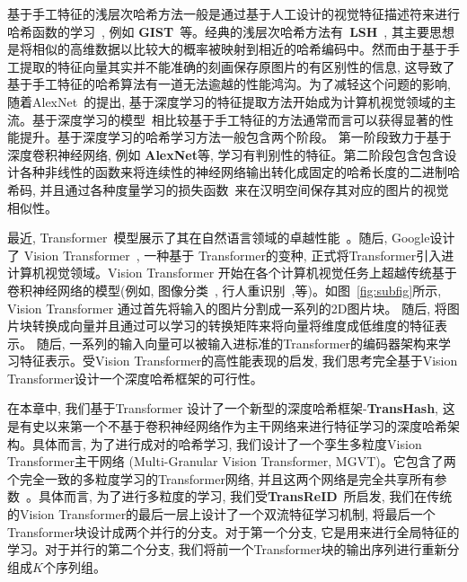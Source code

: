 基于手工特征的浅层次哈希方法一般是通过基于人工设计的视觉特征描述符来进行哈希函数的学习~\cite{charikar2002similarity, indyk1997locality, weiss2008spectral}, 例如 \textbf{GIST}~\cite{oliva2001modeling}等。经典的浅层次哈希方法有~\textbf{LSH}~\cite{indyk1997locality}, 其主要思想是将相似的高维数据以比较大的概率被映射到相近的哈希编码中。然而由于基于手工提取的特征向量其实并不能准确的刻画保存原图片的有区别性的信息, 这导致了基于手工特征的哈希算法有一道无法逾越的性能鸿沟。为了减轻这个问题的影响, 随着AlexNet~\cite{}的提出, 基于深度学习的特征提取方法开始成为计算机视觉领域的主流。基于深度学习的模型~\cite{dosovitskiy2020image, russakovsky2015imagenet}相比较基于手工特征的方法通常而言可以获得显著的性能提升。基于深度学习的哈希学习方法一般包含两个阶段。 第一阶段致力于基于深度卷积神经网络, 例如 \textbf{AlexNet}等, 学习有判别性的特征。第二阶段包含包含设计各种非线性的函数来将连续性的神经网络输出转化成固定的哈希长度的二进制哈希码, 并且通过各种度量学习的损失函数~\cite{cakir2019hashing,cao2018deep,erin2015deep,gong2012iterative, li2015feature}来在汉明空间保存其对应的图片的视觉相似性。 \par
最近, Transformer~\cite{vaswani2017attention}模型展示了其在自然语言领域的卓越性能~\cite{brown2020language, devlin2018bert}。随后, Google设计了 Vision Transformer~\cite{dosovitskiy2020image}, 一种基于 Transformer的变种, 正式将Transformer引入进计算机视觉领域。Vision Transformer 开始在各个计算机视觉任务上超越传统基于卷积神经网络的模型(例如, 图像分类~\cite{dosovitskiy2020image}, 行人重识别~\cite{he2021transreid},等)。如图~\ref{fig:subfig}所示, Vision Transformer 通过首先将输入的图片分割成一系列的2D图片块。 随后, 将图片块转换成向量并且通过可以学习的转换矩阵来将向量将维度成低维度的特征表示。 随后, 一系列的输入向量可以被输入进标准的Transformer的编码器架构来学习特征表示。受Vision Transformer的高性能表现的启发, 我们思考完全基于Vision Transformer设计一个深度哈希框架的可行性。\par
在本章中, 我们基于Transformer 设计了一个新型的深度哈希框架-\textbf{TransHash}, 这是有史以来第一个不基于卷积神经网络作为主干网络来进行特征学习的深度哈希架构。具体而言, 为了进行成对的哈希学习, 我们设计了一个孪生多粒度Vision Transformer主干网络 (Multi-Granular Vision Transformer, MGVT)。它包含了两个完全一致的多粒度学习的Transformer网络, 并且这两个网络是完全共享所有参数~\cite{bromley1993signature}。具体而言, 为了进行多粒度的学习, 我们受\textbf{TransReID}~\cite{he2021transreid}所启发, 我们在传统的Vision Transformer的最后一层上设计了一个双流特征学习机制, 将最后一个Transformer块设计成两个并行的分支。对于第一个分支, 它是用来进行全局特征的学习。对于并行的第二个分支, 我们将前一个Transformer块的输出序列进行重新分组成$K$个序列组。
